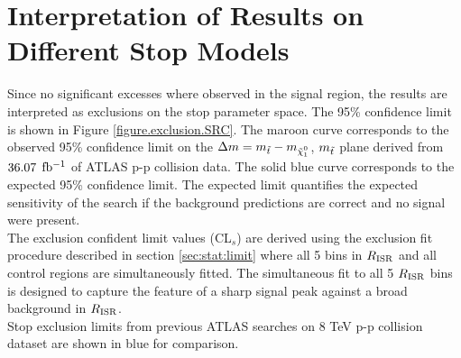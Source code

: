 \section{Interpretation of Results on Different Stop Models}
\label{chap:Interpretation}

\indent Since no significant excesses where observed in the signal region, the results are interpreted as exclusions on the stop parameter space.  The 95\% confidence limit is shown in Figure \ref{figure.exclusion.SRC}.  The maroon curve corresponds to the observed 95\% confidence limit on the $\Delta m = m_{\stop}-m_{\ninoone}$, $m_{\tilde{t}}$ plane derived from $36.07$ $\mbox{fb$^{-1}$}$ of ATLAS p-p collision data.   The solid blue curve corresponds to the expected 95\% confidence limit.  The expected limit quantifies the expected sensitivity of the search if the background predictions are correct and no signal were present.  \\

\indent The exclusion confident limit values (CL$_s$) are derived using the exclusion fit procedure described in section \ref{sec:stat:limit} where all 5 bins in $R_{\mathrm{ISR}}$ and all control regions are simultaneously fitted. The simultaneous fit to all 5 $R_{\mathrm{ISR}}$ bins is designed to capture the feature of a sharp signal peak against a broad background in $R_{\mathrm{ISR}}$. \\

\indent Stop exclusion limits from previous ATLAS searches on 8 TeV p-p collision dataset are shown in blue for comparison. \\

